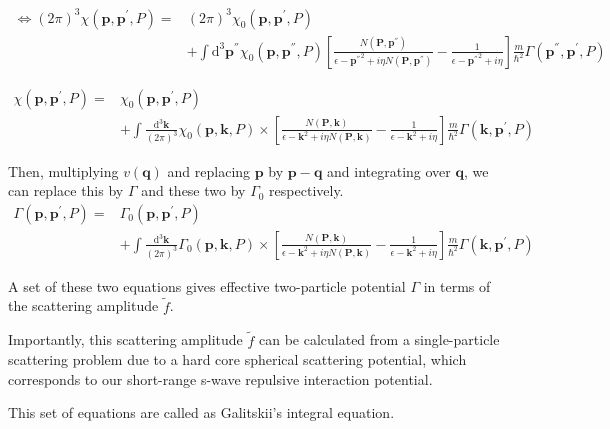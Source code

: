 \[ \begin{split} \Leftrightarrow (2\pi)^3 \chi(\mathbf{p},\mathbf{p}^{'},P) =& (2\pi)^3\chi_0(\mathbf{p},\mathbf{p}^{'},P) \\
&+ \int \mathrm{d}^3 \mathbf{p}^{''} \chi_0(\mathbf{p},\mathbf{p}^{''},P) \left[ \frac{N(\mathbf{P},\mathbf{p}^{''})}{\epsilon - {\mathbf{p}^{''}}^2+i \eta N(\mathbf{P},\mathbf{p}^{''})} - \frac{1}{\epsilon - {\mathbf{p}^{''}}^2+i \eta} \right]\frac{m}{\hbar^2} \Gamma(\mathbf{p}^{''},\mathbf{p}^{'},P) \end{split}\]

\[ \begin{split} \chi(\mathbf{p},\mathbf{p}^{'},P) =& \chi_0(\mathbf{p},\mathbf{p}^{'},P) \\
&+ \int \frac{\mathrm{d}^3 \mathbf{k}}{(2\pi)^3} \chi_0(\mathbf{p},\mathbf{k},P) \times \left[ \frac{N(\mathbf{P},\mathbf{k})}{\epsilon - {\mathbf{k}}^2+i \eta N(\mathbf{P},\mathbf{k})} - \frac{1}{\epsilon - {\mathbf{k}}^2+i \eta} \right]\frac{m}{\hbar^2} \Gamma(\mathbf{k},\mathbf{p}^{'},P)\end{split}\]

Then, multiplying $v(\mathbf{q})$ and replacing $\mathbf{p}$ by $\mathbf{p}-\mathbf{q}$ and integrating over $\mathbf{q}$, we can replace this by $\Gamma$ and these two by $\Gamma_0$ respectively.
\begin{equation} \label{Eqs2.7.24} \begin{split}
\Gamma(\mathbf{p},\mathbf{p}^{'},P) =& \Gamma_0(\mathbf{p},\mathbf{p}^{'},P) \\
&+ \int \frac{\mathrm{d}^3 \mathbf{k}}{(2\pi)^3} \Gamma_0(\mathbf{p},\mathbf{k},P) \times \left[ \frac{N(\mathbf{P},\mathbf{k})}{\epsilon - {\mathbf{k}}^2+i \eta N(\mathbf{P},\mathbf{k})} - \frac{1}{\epsilon - {\mathbf{k}}^2+i \eta} \right]\frac{m}{\hbar^2} \Gamma(\mathbf{k},\mathbf{p}^{'},P)
\end{split}\end{equation}

A set of these two equations gives effective two-particle potential $\Gamma$ in terms of the scattering amplitude $\tilde{f}$.

Importantly, this scattering amplitude $\tilde{f}$ can be calculated from a single-particle scattering problem due to a hard core spherical scattering potential, which corresponds to our short-range s-wave repulsive interaction potential.

This set of equations are called as Galitskii's integral equation.

